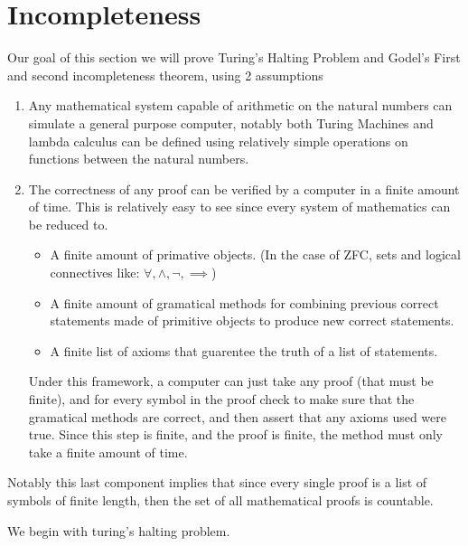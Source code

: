 \chapter{Incompleteness}
Our goal of this section we will prove Turing's Halting Problem and Godel's First and second incompleteness theorem, using 2 assumptions
\begin{enumerate}
    \item Any mathematical system capable of arithmetic on the natural numbers can simulate a general purpose computer, notably both Turing Machines and lambda calculus can be defined using relatively simple operations on functions between the natural numbers.
    \item The correctness of any proof can be verified by a computer in a finite amount of time. This is relatively easy to see since every system of mathematics can be reduced to.
    \begin{itemize}
        \item A finite amount of primative objects. (In the case of ZFC, sets and logical connectives like: $\forall, \wedge, \neg, \implies$)
        \item A finite amount of gramatical methods for combining previous correct statements made of primitive objects to produce new correct statements.
        \item A finite list of axioms that guarentee the truth of a list of statements.
    \end{itemize}
    Under this framework, a computer can just take any proof (that must be finite), and for every symbol in the proof check to make sure that the gramatical methods are correct, and then assert that any axioms used were true. Since this step is finite, and the proof is finite, the method must only take a finite amount of time.
\end{enumerate}
Notably this last component implies that since every single proof is a list of symbols of finite length, then the set of all mathematical proofs is countable.

We begin with turing's halting problem.


